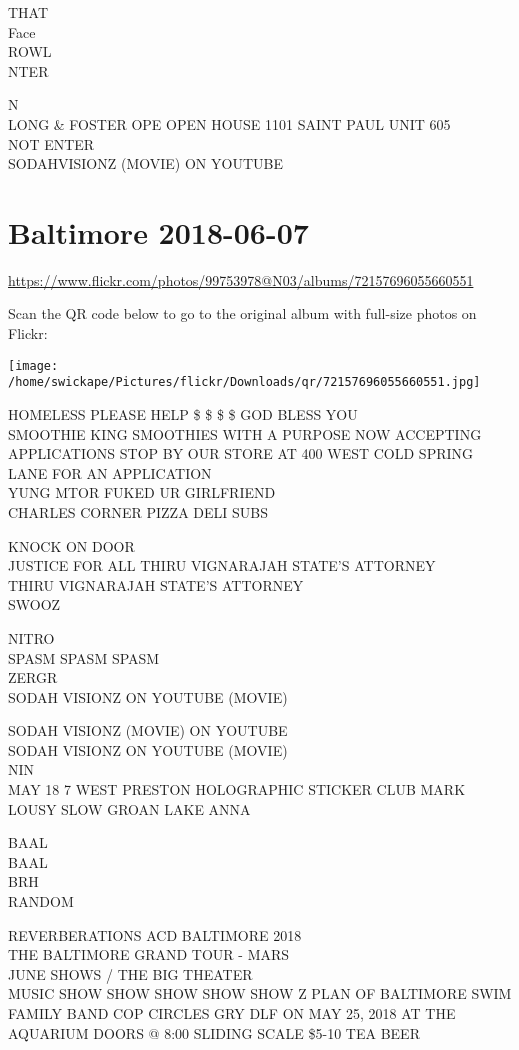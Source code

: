 \documentclass[10pt,letterpaper]{article}
\begin{document}
THAT\\
Face\\
ROWL\\
NTER

N\\
LONG \& FOSTER OPE OPEN HOUSE 1101 SAINT PAUL UNIT 605\\
NOT ENTER\\
SODAHVISIONZ (MOVIE) ON YOUTUBE


\section*{Baltimore 2018-06-07}

\url{https://www.flickr.com/photos/99753978@N03/albums/72157696055660551}

Scan the QR code below to go to the original album with full-size photos on Flickr:

\texttt{[image: /home/swickape/Pictures/flickr/Downloads/qr/72157696055660551.jpg]}


HOMELESS PLEASE HELP \$ \$ \$ \$ GOD BLESS YOU\\
SMOOTHIE KING SMOOTHIES WITH A PURPOSE NOW ACCEPTING APPLICATIONS STOP BY OUR STORE AT 400 WEST COLD SPRING LANE FOR AN APPLICATION\\
YUNG MTOR FUKED UR GIRLFRIEND\\
CHARLES CORNER PIZZA DELI SUBS

KNOCK ON DOOR\\
JUSTICE FOR ALL THIRU VIGNARAJAH STATE'S ATTORNEY\\
THIRU VIGNARAJAH STATE'S ATTORNEY\\
SWOOZ

NITRO\\
SPASM SPASM SPASM\\
ZERGR\\
SODAH VISIONZ ON YOUTUBE (MOVIE)

SODAH VISIONZ (MOVIE) ON YOUTUBE\\
SODAH VISIONZ ON YOUTUBE (MOVIE)\\
NIN\\
MAY 18 7 WEST PRESTON HOLOGRAPHIC STICKER CLUB MARK LOUSY SLOW GROAN LAKE ANNA

BAAL\\
BAAL\\
BRH\\
RANDOM

REVERBERATIONS ACD BALTIMORE 2018\\
THE BALTIMORE GRAND TOUR {-} MARS\\
JUNE SHOWS / THE BIG THEATER\\
MUSIC SHOW SHOW SHOW SHOW SHOW Z PLAN OF BALTIMORE SWIM FAMILY BAND COP CIRCLES GRY DLF ON MAY 25, 2018 AT THE AQUARIUM DOORS @ 8:00 SLIDING SCALE \$5{-}10 TEA BEER
\end{document}
